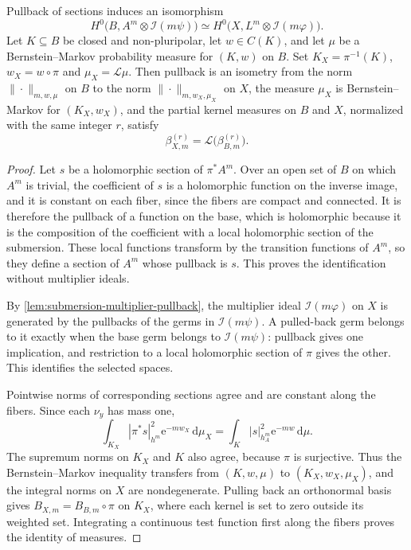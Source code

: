 \begin{proposition}\label{prop:partial-kernel-submersion}
Pullback of sections induces an isomorphism
\[
 H^0\bigl(B,A^m\otimes\mathcal I(m\psi)\bigr)
       \simeq H^0\bigl(X,L^m\otimes\mathcal I(m\varphi)\bigr).
\]
Let $K\subseteq B$ be closed and non-pluripolar, let $w\in C(K)$, and let $\mu$ be a Bernstein--Markov probability measure for $(K,w)$ on $B$. Set $K_X=\pi^{-1}(K)$, $w_X=w\circ\pi$ and $\mu_X=\mathcal L\mu$. Then pullback is an isometry from the norm $\|\cdot\|_{m,w,\mu}$ on $B$ to the norm $\|\cdot\|_{m,w_X,\mu_X}$ on $X$, the measure $\mu_X$ is Bernstein--Markov for $(K_X,w_X)$, and the partial kernel measures on $B$ and $X$, normalized with the same integer $r$, satisfy
\[
 \beta_{X,m}^{(r)}=\mathcal L\bigl(\beta_{B,m}^{(r)}\bigr).
\]
\end{proposition}
\begin{proof}
Let $s$ be a holomorphic section of $\pi^*A^m$. Over an open set of $B$ on which $A^m$ is trivial, the coefficient of $s$ is a holomorphic function on the inverse image, and it is constant on each fiber, since the fibers are compact and connected. It is therefore the pullback of a function on the base, which is holomorphic because it is the composition of the coefficient with a local holomorphic section of the submersion. These local functions transform by the transition functions of $A^m$, so they define a section of $A^m$ whose pullback is $s$. This proves the identification without multiplier ideals.

By \cref{lem:submersion-multiplier-pullback}, the multiplier ideal $\mathcal I(m\varphi)$ on $X$ is generated by the pullbacks of the germs in $\mathcal I(m\psi)$. A pulled-back germ belongs to it exactly when the base germ belongs to $\mathcal I(m\psi)$: pullback gives one implication, and restriction to a local holomorphic section of $\pi$ gives the other. This identifies the selected spaces.

Pointwise norms of corresponding sections agree and are constant along the fibers. Since each $\nu_y$ has mass one,
\[
 \int_{K_X}|\pi^*s|_{h^m}^2\mathrm{e}^{-mw_X}\,\mathrm{d}\mu_X
       =\int_K|s|_{h_A^m}^2\mathrm{e}^{-mw}\,\mathrm{d}\mu.
\]
The supremum norms on $K_X$ and $K$ also agree, because $\pi$ is surjective. Thus the Bernstein--Markov inequality transfers from $(K,w,\mu)$ to $(K_X,w_X,\mu_X)$, and the integral norms on $X$ are nondegenerate. Pulling back an orthonormal basis gives $B_{X,m}=B_{B,m}\circ\pi$ on $K_X$, where each kernel is set to zero outside its weighted set. Integrating a continuous test function first along the fibers proves the identity of measures.
\end{proof}

